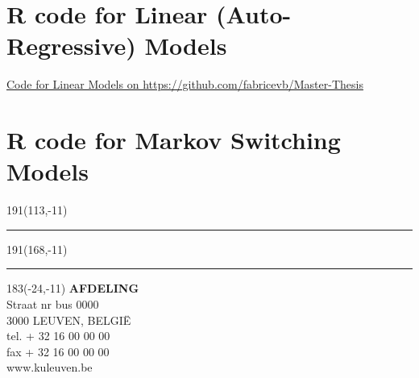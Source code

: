 \documentclass[12pt,a4paper,oneside]{book}
\begin{document}
\section*{R code for Linear (Auto-Regressive) Models}

\href{https://github.com/fabricevb/Master-Thesis/blob/master/R%20Code/Linear%20Regression.R}{Code for Linear Models on https://github.com/fabricevb/Master-Thesis}


\section*{R code for Markov Switching Models}

\newpage

\thispagestyle{empty}
\sffamily
%
\begin{textblock}{191}(113,-11)
{\color{blueline}\rule{160pt}{5.5pt}}
\end{textblock}
%
\begin{textblock}{191}(168,-11)
{\color{blueline}\rule{5.5pt}{59pt}}
\end{textblock}
%
\begin{textblock}{183}(-24,-11)
\textblockcolour{}
\flushright
\fontsize{7}{7.5}\selectfont
\textbf{AFDELING}\\
Straat nr bus 0000\\
3000 LEUVEN, BELGI\"{E}\\
tel. + 32 16 00 00 00\\
fax + 32 16 00 00 00\\
www.kuleuven.be\\
\end{textblock}
%
\end{document}
